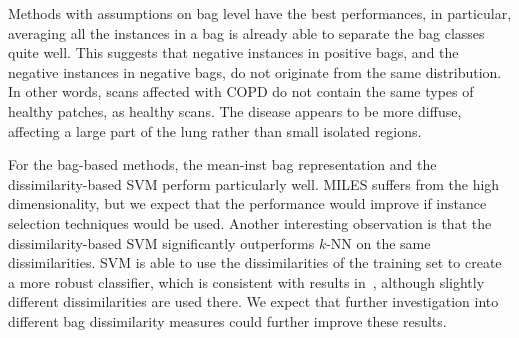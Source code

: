\documentclass[10pt,conference,a4paper]{IEEEtran}
\begin{document}


Methods with assumptions on bag level have the best performances, in particular, averaging all the instances in a bag is already able to separate the bag classes quite well. This suggests that negative instances in positive bags, and the negative instances in negative bags, do not originate from the same distribution. In other words, scans affected with COPD do not contain the same types of healthy patches, as healthy scans. The disease appears to be more diffuse, affecting a large part of the lung rather than small isolated regions.

For the bag-based methods, the mean-inst bag representation and the dissimilarity-based SVM perform particularly well. MILES suffers from the high dimensionality, but we expect that the performance would improve if instance selection techniques would be used. Another interesting observation is that the dissimilarity-based SVM significantly outperforms $k$-NN on the same dissimilarities. SVM is able to use the dissimilarities of the training set to create a more robust classifier, which is consistent with results in~\cite{sorensen2010image}, although slightly different dissimilarities are used there. We expect that further investigation into different bag dissimilarity measures could further improve these results.
\end{document}
